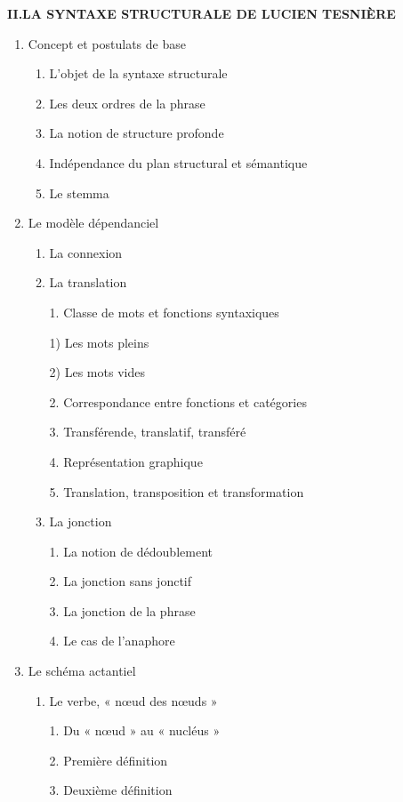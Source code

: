\begin{keybox}
\begin{enumerate}[label=\arabic*.]
\end{enumerate}
\textbf{II.\quad LA SYNTAXE STRUCTURALE DE LUCIEN TESNIÈRE}
\begin{enumerate}[label=\arabic*.]
\item Concept et postulats de base
\begin{enumerate}[label=\textcircled{\scriptsize\arabic*}]
\item L’objet de la syntaxe structurale
\item Les deux ordres de la phrase
\item La notion de structure profonde
\item Indépendance du plan structural et sémantique
\item Le stemma
\end{enumerate}
\item Le modèle dépendanciel
\begin{enumerate}[label=\textcircled{\scriptsize\arabic*}]
\item La connexion
\item La translation\par
1. Classe de mots et fonctions syntaxiques\par
\hspace{1em}1) Les mots pleins\par \hspace{1em}2) Les mots vides\par
2. Correspondance entre fonctions et catégories\par
3. Transférende, translatif, transféré\par
4. Représentation graphique\par
5. Translation, transposition et transformation
\item La jonction\par
1. La notion de dédoublement\par 2. La jonction sans jonctif\par
3. La jonction de la phrase\par 4. Le cas de l’anaphore
\end{enumerate}
\item Le schéma actantiel
\begin{enumerate}[label=\textcircled{\scriptsize\arabic*}]
\item Le verbe, « nœud des nœuds »\par
1. Du « nœud » au « nucléus »\par 2. Première définition\par 3. Deuxième définition

\end{enumerate}
\end{enumerate}
\end{keybox}
